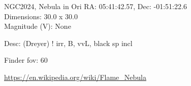 \begin{block}{NGC2024, Nebula in Ori}
    RA: 05:41:42.57, Dec: -01:51:22.6 \\ 
    Dimensions: 30.0 x 30.0 \\ 
    Magnitude (V): None


    Desc: (Dreyer) ! irr, B, vvL, black sp incl 

    Finder fov: 60 

    \url{https://en.wikipedia.org/wiki/Flame_Nebula} 
\end{block}